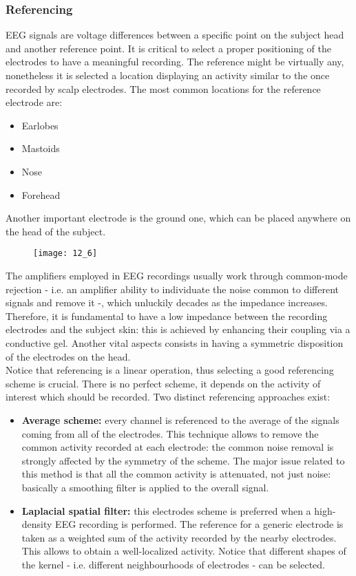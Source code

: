 \subsubsection{Referencing}
EEG signals are voltage differences between a specific point on the subject head and another
reference point. It is critical to select a proper positioning of the electrodes to have a
meaningful recording. The reference might be virtually any, nonetheless it is selected a
location displaying an activity similar to the once recorded by scalp electrodes.
The most common locations for the reference electrode are:
\begin{itemize}
    \item Earlobes
    \item Mastoids
    \item Nose
    \item Forehead
\end{itemize}
Another important electrode is the ground one, which can be placed anywhere on the head of the
subject.
\begin{figure}[H]
    \centering
    \texttt{[image: 12\_6]}
\end{figure}
The amplifiers employed in EEG recordings usually work through common-mode rejection
- i.e. an amplifier ability to individuate the noise common to different signals and remove
it -, which unluckily decades as the impedance increases. Therefore, it is fundamental to
have a low impedance between the recording electrodes and the subject skin: this is achieved
by enhancing their coupling via a conductive gel. Another vital aspects consists in having a
symmetric disposition of the electrodes on the head.\\
Notice that referencing is a linear operation, thus selecting a good referencing scheme is
crucial. There is no perfect scheme, it depends on the activity of interest which should be
recorded. Two distinct referencing approaches exist:
\begin{itemize}
    \item \textbf{Average scheme:} every channel is referenced to the average of the signals coming from
          all of the electrodes. This technique allows to remove the common activity recorded at
          each electrode: the common noise removal is strongly affected by the symmetry of the scheme.
          The major issue related to this method is that all the common activity is attenuated, not
          just noise: basically a smoothing filter is applied to the overall signal.
    \item \textbf{Laplacial spatial filter:} this electrodes scheme is preferred when a high-density
          EEG recording is performed. The reference for a generic electrode is taken as a weighted
          sum of the activity recorded by the nearby electrodes. This allows to obtain a
          well-localized activity. Notice that different shapes of the kernel - i.e. different
          neighbourhoods of electrodes - can be selected.
\end{itemize}

